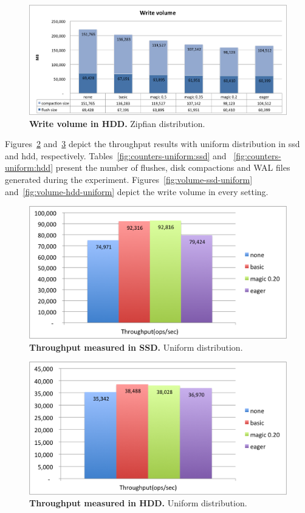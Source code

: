 {\begin{figure}[htb]
\includegraphics[width=\figw]{Figs/volume-hdd.png}
\caption{{\bf  Write volume in HDD.} Zipfian distribution.
}
\label{fig:volume-hdd}
\end{figure}

Figures~\ref{fig:throughput-ssd-uniform} and~\ref{fig:throughput-hdd-uniform} depict the throughput results with uniform distribution in ssd and hdd, respectively.
Tables~\ref{fig:counters-uniform:ssd} and ~\ref{fig:counters-uniform:hdd} present the number of flushes, disk compactions and WAL files generated during the experiment.
Figures~\ref{fig:volume-ssd-uniform} and~\ref{fig:volume-hdd-uniform} depict the write volume in every setting. 


\begin{figure}[htb]
\includegraphics[width=\figw]{Figs/throughput-ssd-uniform.png}
\caption{{\bf  Throughput measured in SSD.} Uniform distribution.
}
\label{fig:throughput-ssd-uniform}
\end{figure}

\begin{figure}[htb]
\includegraphics[width=\figw]{Figs/throughput-hdd-uniform.png}
\caption{{\bf  Throughput measured in HDD.} Uniform distribution. 
}
\label{fig:throughput-hdd-uniform}
\end{figure}


}
